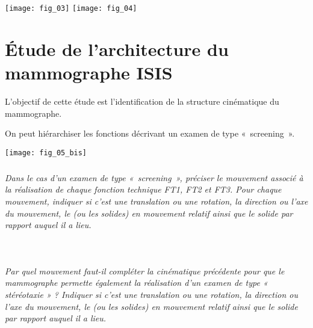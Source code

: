 \begin{multicols}{2}


\begin{center}
\texttt{[image: fig\_03]}
\hspace{1cm}
\texttt{[image: fig\_04]}
\end{center}


\ifprof
\else
\begin{center}
\end{center}
\fi

\section*{Étude de l’architecture du mammographe ISIS}

\begin{obj}
L’objectif de cette étude est l’identification de la structure cinématique du mammographe.
\end{obj}

On peut hiérarchiser les fonctions décrivant un examen de type «~screening~».
\begin{center}
\texttt{[image: fig\_05\_bis]}
\end{center}

\subparagraph{}\textit{Dans le cas d’un examen de type «~screening~», préciser le mouvement associé à la réalisation de chaque fonction technique FT1, FT2 et FT3. Pour chaque mouvement, indiquer si c’est une translation ou une rotation, la direction ou l’axe du mouvement, le (ou les solides) en mouvement relatif ainsi que le solide par rapport auquel il a lieu.}
\ifprof
\begin{corrige}~\\
\end{corrige}
\else
\fi



\subparagraph{}\textit{Par quel mouvement faut-il compléter la cinématique précédente pour
que le mammographe permette également la réalisation d’un examen de type « stéréotaxie » ? Indiquer si c’est une
translation ou une rotation, la direction ou l’axe du mouvement, le (ou les solides) en mouvement relatif ainsi que le
solide par rapport auquel il a lieu.}
\ifprof
\begin{corrige}~\\
\end{corrige}
\else
\fi





\end{multicols}
